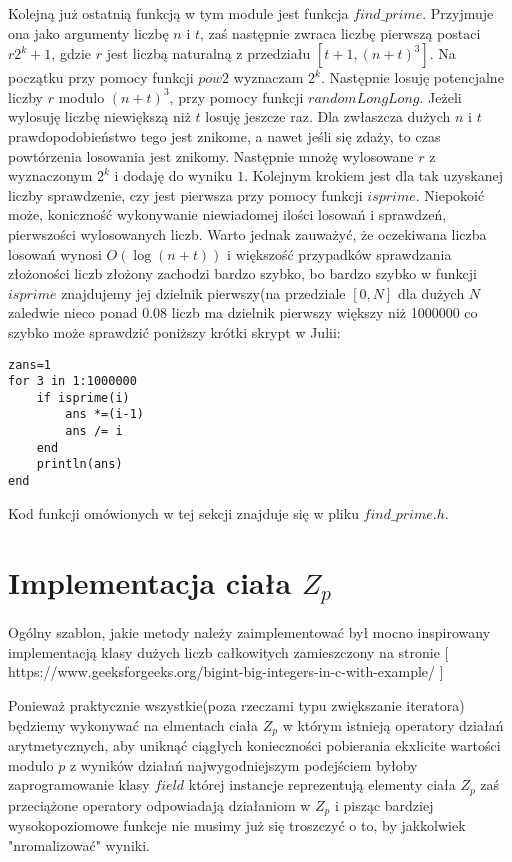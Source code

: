 \documentclass{article}
\begin{document}
Kolejną już ostatnią funkcją w tym module jest funkcja $find\_prime$. Przyjmuje ona jako argumenty liczbę $n$ i $t$, zaś następnie zwraca liczbę pierwszą postaci $r2^k+1$, gdzie $r$ jest liczbą naturalną z przedziału $[t+1,(n+t)^3]$. Na początku przy pomocy funkcji $pow2$ wyznaczam $2^k$. Następnie losuję potencjalne liczby $r$ modulo $(n+t)^3$, przy pomocy
funkcji $randomLongLong$. Jeżeli wylosuję liczbę niewiększą niż $t$ losuję jeszcze raz. Dla zwłaszcza dużych $n$ i $t$
prawdopodobieństwo tego jest znikome, a nawet jeśli się zdaży, to czas powtórzenia losowania jest znikomy. Następnie mnożę
wylosowane $r$ z wyznaczonym $2^k$ i dodaję do wyniku $1$. Kolejnym krokiem jest dla tak uzyskanej liczby sprawdzenie, czy 
jest pierwsza przy pomocy funkcji $isprime$. Niepokoić może, koniczność wykonywanie niewiadomej ilości losowań i sprawdzeń, pierwszości wylosowanych liczb. Warto jednak zauważyć, że oczekiwana liczba losowań wynosi $O(\log(n+t))$ i większość przypadków sprawdzania złożoności liczb złożony zachodzi bardzo szybko, bo bardzo szybko w funkcji $isprime$ znajdujemy jej dzielnik pierwszy(na przedziale $[0,N]$ dla dużych $N$ zaledwie nieco ponad $0.08$ liczb ma dzielnik pierwszy większy niż 1000000 co szybko może sprawdzić poniższy krótki skrypt w Julii:
\begin{lstlisting}
zans=1
for 3 in 1:1000000
    if isprime(i)
        ans *=(i-1)
        ans /= i
    end 
    println(ans)
end
\end{lstlisting}
Kod funkcji omówionych w tej sekcji znajduje się w pliku $find\_prime.h$.

\section{Implementacja ciała $Z_p$}
Ogólny szablon, jakie metody należy zaimplementować był 
mocno inspirowany implementacją klasy dużych liczb całkowitych
zamieszczony na stronie [ https://www.geeksforgeeks.org/bigint-big-integers-in-c-with-example/ ]


Ponieważ praktycznie wszystkie(poza rzeczami typu zwiększanie iteratora) będziemy wykonywać na elmentach ciała
$Z_p$ w którym istnieją operatory działań arytmetycznych, aby uniknąć ciągłych konieczności pobierania ekxlicite
wartości modulo $p$ z wyników działań najwygodniejszym podejściem byłoby zaprogramowanie klasy $field$ której instancje
reprezentują elementy ciała $Z_p$ zaś przeciążone operatory odpowiadają działaniom w $Z_p$ i pisząc bardziej 
wysokopoziomowe funkcje nie musimy już się troszczyć o to, by jakkolwiek "nromalizować" wyniki. 
\end{document}
